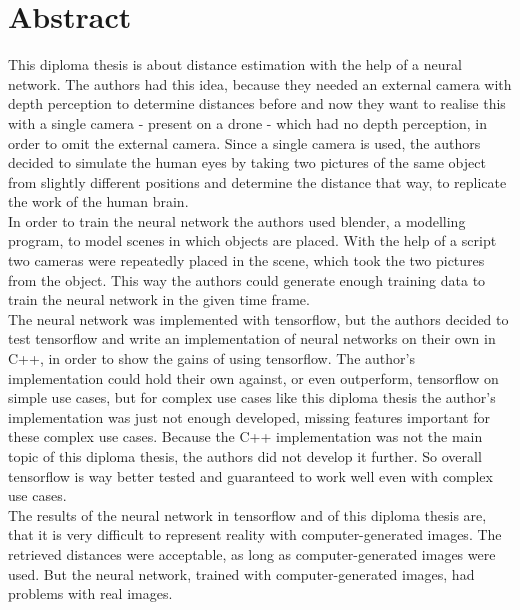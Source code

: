 \chapter{Abstract}

This diploma thesis is about distance estimation with the help of a neural network. The authors had this idea, because they needed an external camera with depth perception to determine distances before and now they want to realise this with a single camera - present on a drone - which had no depth perception, in order to omit the external camera. Since a single camera is used, the authors decided to simulate the human eyes by taking two pictures of the same object from slightly different positions and determine the distance that way, to replicate the work of the human brain.\\
In order to train the neural network the authors used blender, a modelling program, to model scenes in which objects are placed. With the help of a script two cameras were repeatedly placed in the scene, which took the two pictures from the object. This way the authors could generate enough training data to train the neural network in the given time frame.\\
The neural network was implemented with tensorflow, but the authors decided to test tensorflow and write an implementation of neural networks on their own in C++, in order to show the gains of using tensorflow. The author's implementation could hold their own against, or even outperform, tensorflow on simple use cases, but for complex use cases like this diploma thesis the author's implementation was just not enough developed, missing features important for these complex use cases. Because the C++ implementation was not the main topic of this diploma thesis, the authors did not develop it further. So overall tensorflow is way better tested and guaranteed to work well even with complex use cases.\\
The results of the neural network in tensorflow and of this diploma thesis are, that it is very difficult to represent reality with computer-generated images. The retrieved distances were acceptable, as long as computer-generated images were used. But the neural network, trained with computer-generated images, had problems with real images.